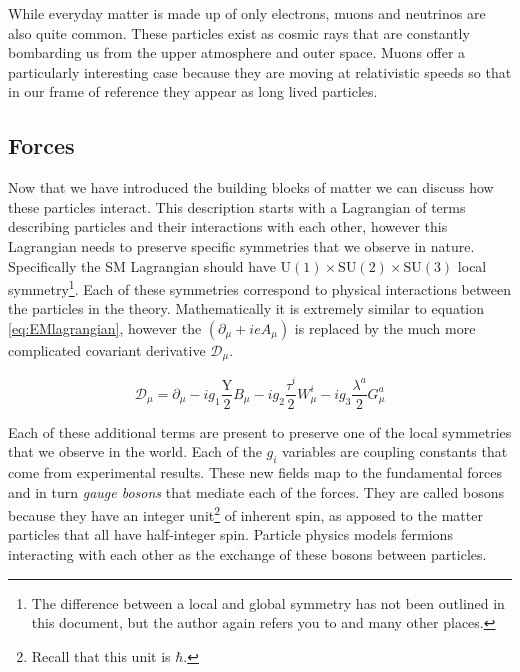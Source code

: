 While everyday matter is made up of only electrons, muons and neutrinos are also quite common. These particles exist as cosmic rays that are constantly bombarding us from the upper atmosphere and outer space. Muons offer a particularly interesting case because they are moving at relativistic speeds so that in our frame of reference they appear as long lived particles.

\subsection{Forces}
\label{sec:TheForces}

Now that we have introduced the building blocks of matter we can discuss how these particles interact. This description starts with a Lagrangian of terms describing particles and their interactions with each other, however this Lagrangian needs to preserve specific symmetries that we observe in nature. Specifically the SM Lagrangian should have $\mathrm{U}(1) \times \mathrm{SU}(2) \times \mathrm{SU}(3)$ local symmetry\footnote{The difference between a local and global symmetry has not been outlined in this document, but the author again refers you to \cite{Armstrong:1988,Miller:1972,Oliver:1993,Tung:1985} and many other places.}. Each of these symmetries correspond to physical interactions between the particles in the theory. Mathematically it is extremely similar to equation \ref{eq:EMlagrangian}, however the $\left(\partial_{\mu} + ieA_{\mu}\right)$ is replaced by the much more complicated covariant derivative $\mathcal{D}_{\mu}$.

\begin{equation}
\label{eq:CovariantD}
\mathcal{D}_{\mu} = \partial_{\mu} - i g_{1} \frac{\mathrm{Y}}{2}B_{\mu} - i g_{2} \frac{\tau^{i}}{2}W^{i}_{\mu} - i g_{3} \frac{\lambda^{a}}{2}G^{a}_{\mu}
\end{equation}

Each of these additional terms are present to preserve one of the local symmetries that we observe in the world. Each of the $g_{i}$ variables are coupling constants that come from experimental results. These new fields map to the fundamental forces and in turn \textit{gauge bosons} that mediate each of the forces. They are called bosons because they have an integer unit\footnote{Recall that this unit is $\hbar$.} of inherent spin, as apposed to the matter particles that all have half-integer spin. Particle physics models fermions interacting with each other as the exchange of these bosons between particles.

